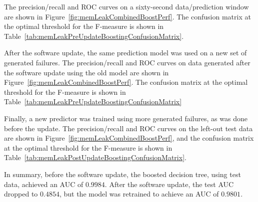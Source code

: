 The precision/recall and \ac{ROC} curves on a sixty-second data/prediction
window are shown in Figure~\ref{fig:memLeakCombinedBoostPerf}.  The confusion
matrix at the optimal threshold for the F-measure is shown in
Table~\ref{tab:memLeakPreUpdateBoostingConfusionMatrix}.

\figMemLeakCombinedBoostPerf
\tabMemLeakPreUpdateBoostingConfusionMatrix

After the software update, the same prediction model was used on a new set of
generated failures.  The precision/recall and \ac{ROC} curves on data generated
after the software update using the old model are shown in
Figure~\ref{fig:memLeakCombinedBoostPerf}.  The confusion matrix at the optimal
threshold for the F-measure is shown in
Table~\ref{tab:memLeakPreUpdateBoostingConfusionMatrix}

\tabMemLeakPostUpdateBoostingSameModelConfusionMatrix

Finally, a new predictor was trained using more generated failures, as was done
before the update.  The precision/recall and \ac{ROC} curves on the left-out
test data are shown in Figure~\ref{fig:memLeakCombinedBoostPerf}, and the
confusion matrix at the optimal threshold for the F-measure is shown in
Table~\ref{tab:memLeakPostUpdateBoostingConfusionMatrix}.

\tabMemLeakPostUpdateBoostingConfusionMatrix

In summary, before the software update, the boosted decision tree, using test
data, achieved an \ac{AUC} of $0.9984$.  After the software update, the test
\ac{AUC} dropped to $0.4854$, but the model was retrained to achieve an
\ac{AUC} of $0.9801$.

